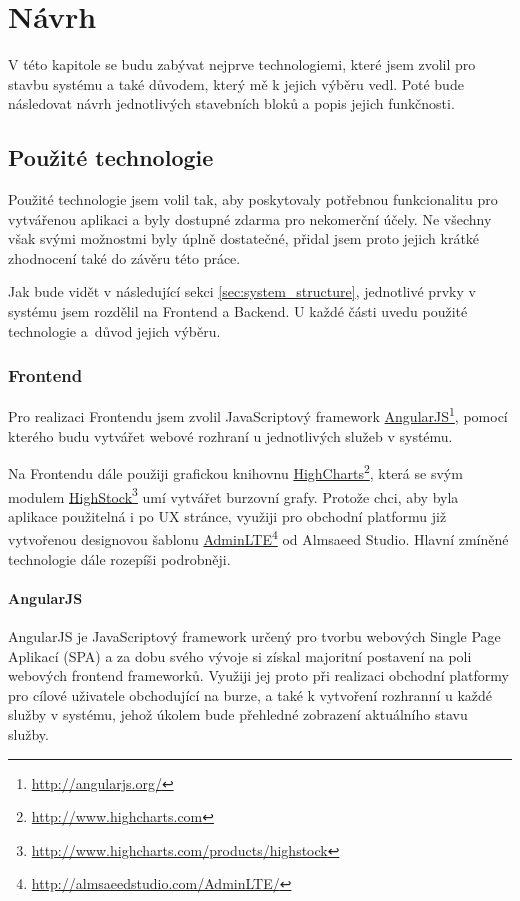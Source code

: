 \documentclass[thesis=M,czech]{FITthesis}[2012/06/26]
\newcommand\fnurl[2]{\href{#2}{#1}\footnote{\url{#2}}}
\begin{document}
\chapter{Návrh}
\label{chap:design}

	V této kapitole se budu zabývat nejprve technologiemi, které jsem zvolil pro stavbu systému a také důvodem, který mě k jejich výběru vedl. Poté bude následovat návrh jednotlivých stavebních bloků a popis jejich funkčnosti.

\section{Použité technologie}
	
	Použité technologie jsem volil tak, aby poskytovaly potřebnou funkcionalitu pro vytvářenou aplikaci a byly dostupné zdarma pro nekomerční účely. Ne všechny však svými možnostmi byly úplně dostatečné, přidal jsem proto jejich krátké zhodnocení také do závěru této práce.
	
	Jak bude vidět v následující sekci \ref{sec:system_structure}, jednotlivé prvky v systému jsem rozdělil na Frontend a Backend. U každé části uvedu použité technologie a~důvod jejich výběru.

\subsection{Frontend}
	
	Pro realizaci Frontendu jsem zvolil JavaScriptový framework \fnurl{AngularJS}{http://angularjs.org/}, pomocí kterého budu vytvářet webové rozhraní u jednotlivých služeb v systému.
		
	Na Frontendu dále použiji grafickou knihovnu \fnurl{HighCharts}{http://www.highcharts.com}, která se svým modulem \fnurl{HighStock}{http://www.highcharts.com/products/highstock} umí vytvářet burzovní grafy. Protože chci, aby byla aplikace použitelná i po UX stránce, využiji pro obchodní platformu již vytvořenou designovou šablonu \fnurl{AdminLTE}{http://almsaeedstudio.com/AdminLTE/} od Almsaeed Studio. Hlavní zmíněné technologie dále rozepíši podrobněji.
	
\subsubsection{AngularJS}
\label{sec:tech_angular}
	AngularJS je JavaScriptový framework určený pro tvorbu webových Single Page Aplikací (SPA) a za dobu svého vývoje si získal majoritní postavení na poli webových frontend frameworků. Využiji jej proto při realizaci obchodní platformy pro cílové uživatele obchodující na burze, a také k vytvoření rozhranní u každé služby v systému, jehož úkolem bude přehledné zobrazení aktuálního stavu služby.
	
\end{document}
